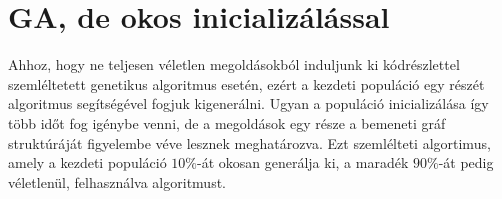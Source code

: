 \section{GA, de okos inicializálással}\label{sec:GA-SMART-INIT}

Ahhoz, hogy ne teljesen véletlen megoldásokból induljunk ki 
kódrészlettel szemléltetett genetikus algoritmus esetén,
ezért a kezdeti populáció egy részét  algoritmus segítségével fogjuk kigenerálni.
Ugyan a populáció inicializálása így több időt fog igénybe venni,
de a megoldások egy része a bemeneti gráf struktúráját figyelembe véve lesznek meghatározva.
Ezt szemlélteti  algortimus, amely a kezdeti populáció $10\%$-át okosan generálja ki,
a maradék $90\%$-át pedig véletlenül, felhasználva  algoritmust.

